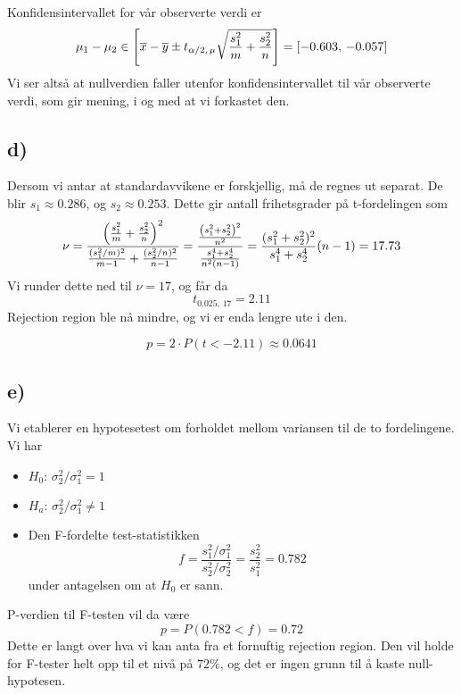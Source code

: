 \documentclass[12p,a4paper]{article}
\renewcommand{\bar}{\overline}
\begin{document}
Konfidensintervallet for vår observerte verdi er
\[
    \mu_1 - \mu_2 \in \qty[\bar{x} - \bar{y} \pm t_{\alpha/2,\, \mu}\sqrt{\frac{s_1^2}{m} + \frac{s_2^2}{n}}] = \qty[-0.603,\, -0.057]
\]
Vi ser altså at nullverdien faller utenfor konfidensintervallet til vår observerte verdi, som gir mening, i og med at vi forkastet den.




\subsection*{d)}
Dersom vi antar at standardavvikene er forskjellig, må de regnes ut separat. De blir $s_1 \approx 0.286$, og $s_2 \approx 0.253$. Dette gir antall frihetsgrader på t-fordelingen som
\[
    \nu = \frac{\qty(\frac{s_1^2}{m}+\frac{s_2^2}{n})^2}{\frac{(s_1^2/m)^2}{m-1} + \frac{(s_2^2/n)^2}{n-1}}
    = \frac{\frac{\qty(s_1^2 + s_2^2)^2}{n^2}}{\frac{s_1^4 + s_2^4}{n^2(n-1)}}
    = \frac{(s_1^2 + s_2^2)^2}{s_1^4 + s_2^4}(n-1) = 17.73
\]
Vi runder dette ned til $\nu = 17$, og får da
\[
    t_{0.025,\, 17} = 2.11
\]
Rejection region ble nå mindre, og vi er enda lengre ute i den.

\[
    p = 2\cdot P(t < -2.11) \approx 0.0641
\]



\subsection*{e)}
Vi etablerer en hypotesetest om forholdet mellom variansen til de to fordelingene. Vi har
\begin{itemize}
    \item $H_0:\, \sigma_2^2/\sigma_1^2 = 1$
    \item $H_a:\, \sigma_2^2/\sigma_1^2 \neq 1$
    \item Den F-fordelte test-statistikken
    \[
        f = \frac{s_1^2/\sigma_1^2}{s_2^2/\sigma_2^2} = \frac{s_2^2}{s_1^2} = 0.782
    \]
    under antagelsen om at $H_0$ er sann.
\end{itemize}

P-verdien til F-testen vil da være
\[
    p = P(0.782 < f) = 0.72
\]
Dette er langt over hva vi kan anta fra et fornuftig rejection region. Den vil holde for F-tester helt opp til et nivå på $72\%$, og det er ingen grunn til å kaste null-hypotesen.
\end{document}
